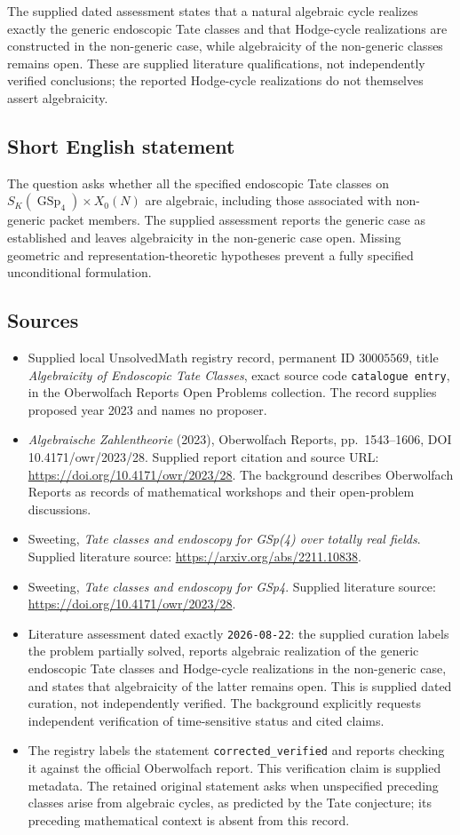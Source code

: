 \documentclass[11pt]{article}
\begin{document}
The supplied dated assessment states that a natural algebraic cycle realizes exactly the generic endoscopic Tate classes and that Hodge-cycle realizations are constructed in the non-generic case, while algebraicity of the non-generic classes remains open. These are supplied literature qualifications, not independently verified conclusions; the reported Hodge-cycle realizations do not themselves assert algebraicity.
\subsection{Short English statement}
The question asks whether all the specified endoscopic Tate classes on \(S_K(\operatorname{GSp}_4)\times X_0(N)\) are algebraic, including those associated with non-generic packet members. The supplied assessment reports the generic case as established and leaves algebraicity in the non-generic case open. Missing geometric and representation-theoretic hypotheses prevent a fully specified unconditional formulation.
\subsection{Sources}
\begin{itemize}
\item Supplied local UnsolvedMath registry record, permanent ID \(30005569\), title \emph{Algebraicity of Endoscopic Tate Classes}, exact source code \texttt{catalogue entry}, in the Oberwolfach Reports Open Problems collection. The record supplies proposed year 2023 and names no proposer.
\item \emph{Algebraische Zahlentheorie} (2023), Oberwolfach Reports, pp.\ 1543--1606, DOI 10.4171/owr/2023/28. Supplied report citation and source URL: \url{https://doi.org/10.4171/owr/2023/28}. The background describes Oberwolfach Reports as records of mathematical workshops and their open-problem discussions.
\item Sweeting, \emph{Tate classes and endoscopy for GSp(4) over totally real fields}. Supplied literature source: \url{https://arxiv.org/abs/2211.10838}.
\item Sweeting, \emph{Tate classes and endoscopy for GSp4}. Supplied literature source: \url{https://doi.org/10.4171/owr/2023/28}.
\item Literature assessment dated exactly \texttt{2026-08-22}: the supplied curation labels the problem partially solved, reports algebraic realization of the generic endoscopic Tate classes and Hodge-cycle realizations in the non-generic case, and states that algebraicity of the latter remains open. This is supplied dated curation, not independently verified. The background explicitly requests independent verification of time-sensitive status and cited claims.
\item The registry labels the statement \texttt{corrected\_verified} and reports checking it against the official Oberwolfach report. This verification claim is supplied metadata. The retained original statement asks when unspecified preceding classes arise from algebraic cycles, as predicted by the Tate conjecture; its preceding mathematical context is absent from this record.
\end{itemize}
\end{document}
